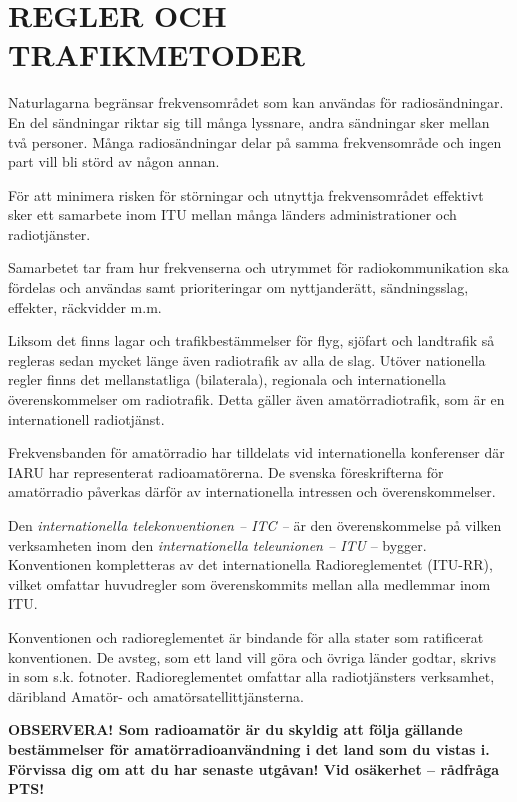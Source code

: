 \chapter{REGLER OCH TRAFIKMETODER}

Naturlagarna begränsar frekvensområdet som kan användas för radiosändningar.
En del sändningar riktar sig till många lyssnare, andra sändningar sker
mellan två personer. Många radiosändningar delar på samma frekvensområde och
ingen part vill bli störd av någon annan.

För att minimera risken för störningar och utnyttja frekvensområdet effektivt
sker ett samarbete inom ITU mellan många länders administrationer och
radiotjänster.

Samarbetet tar fram hur frekvenserna och utrymmet för radiokommunikation ska
fördelas och användas samt prioriteringar om nyttjanderätt, sändningsslag,
effekter, räckvidder m.m.

Liksom det finns lagar och trafikbestämmelser för flyg, sjöfart och landtrafik
så regleras sedan mycket länge även radiotrafik av alla de slag. Utöver
nationella regler finns det mellanstatliga (bilaterala), regionala och
internationella överenskommelser om radiotrafik. Detta gäller även
amatörradiotrafik, som är en internationell radiotjänst.

Frekvensbanden för amatörradio har tilldelats vid internationella konferenser
där IARU har representerat radioamatörerna. De svenska föreskrifterna för
amatörradio påverkas därför av internationella intressen och överenskommelser.

Den \emph{internationella telekonventionen -- ITC --} är den
överenskommelse på vilken verksamheten inom den \emph{internationella
teleunionen -- ITU} -- bygger. Konventionen kompletteras av det internationella
Radioreglementet (ITU-RR), vilket omfattar huvudregler som överenskommits mellan
alla medlemmar inom ITU.

Konventionen och radioreglementet är bindande för alla stater som ratificerat
konventionen. De avsteg, som ett land vill göra och övriga länder godtar,
skrivs in som s.k. fotnoter. Radioreglementet omfattar alla radiotjänsters
verksamhet, däribland Amatör- och amatörsatellittjänsterna.

\textbf{OBSERVERA!  Som radioamatör är du skyldig att följa gällande
  bestämmelser för amatörradioanvändning i det land som du vistas i.
  Förvissa dig om att du har senaste utgåvan!  Vid osäkerhet --
  rådfråga PTS!}
